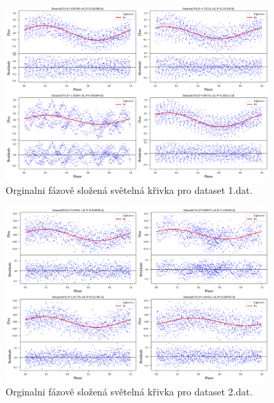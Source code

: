 \documentclass[a4paper,11pt,twocolumn]{article}
\begin{document}
    \begin{figure}
        \centering
        \includegraphics[width=0.9\textwidth]{phase/1_phase_folded_orig.png}
        \caption{Orginalni fázově složená světelná křivka pro dataset 1.dat.}
        \label{fig:1_phase_folded_orig}
    \end{figure}

    \begin{figure}
        \centering
        \includegraphics[width=0.9\textwidth]{phase/2_phase_folded_orig.png}
        \caption{Orginalni fázově složená světelná křivka pro dataset 2.dat.}
        \label{fig:2_phase_folded_orig}
    \end{figure}
\end{document}
